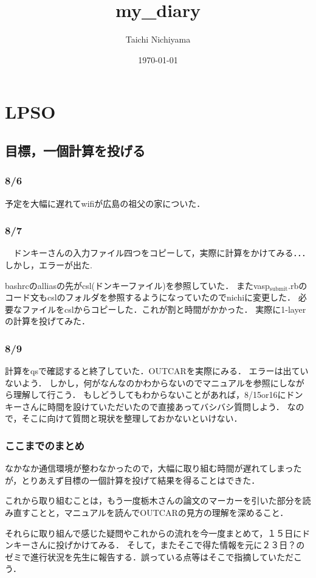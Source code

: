 \documentclass[11pt]{article}
\author{Taichi Nichiyama}
\date{\today}
\title{my\_diary}
\begin{document}
\maketitle
\tableofcontents

\section{LPSO}
\label{sec-1}
\subsection{目標，一個計算を投げる}
\label{sec-1-1}
\subsubsection{8/6}
\label{sec-1-1-1}

予定を大幅に遅れてwifiが広島の祖父の家についた．

\subsubsection{8/7}
\label{sec-1-1-2}

　ドンキーさんの入力ファイル四つをコピーして，実際に計算をかけてみる．．．
しかし，エラーが出た.

bashrcのalliasの先がcsl(ドンキーファイル)を参照していた．
またvasp$_{\text{submit}}$.rbのコード文もcslのフォルダを参照するようになっていたのでnichiに変更した．
必要なファイルをcslからコピーした．これが割と時間がかかった．
実際に1-layerの計算を投げてみた．

\subsubsection{8/9}
\label{sec-1-1-3}

計算をqsで確認すると終了していた．OUTCARを実際にみる．
エラーは出ていないよう．
しかし，何がなんなのかわからないのでマニュアルを参照にしながら理解して行こう．
もしどうしてもわからないことがあれば，8/15or16にドンキーさんに時間を設けていただいたので直接あってバシバシ質問しよう．
なので，そこに向けて質問と現状を整理しておかないといけない．

\subsubsection{ここまでのまとめ}
\label{sec-1-1-4}

なかなか通信環境が整わなかったので，大幅に取り組む時間が遅れてしまったが，とりあえず目標の一個計算を投げて結果を得ることはできた．

これから取り組むことは，もう一度栃木さんの論文のマーカーを引いた部分を読み直すことと，マニュアルを読んでOUTCARの見方の理解を深めること．

それらに取り組んで感じた疑問やこれからの流れを今一度まとめて，１５日にドンキーさんに投げかけてみる．
そして，またそこで得た情報を元に２３日？のゼミで進行状況を先生に報告する．誤っている点等はそこで指摘していただこう．
\end{document}
